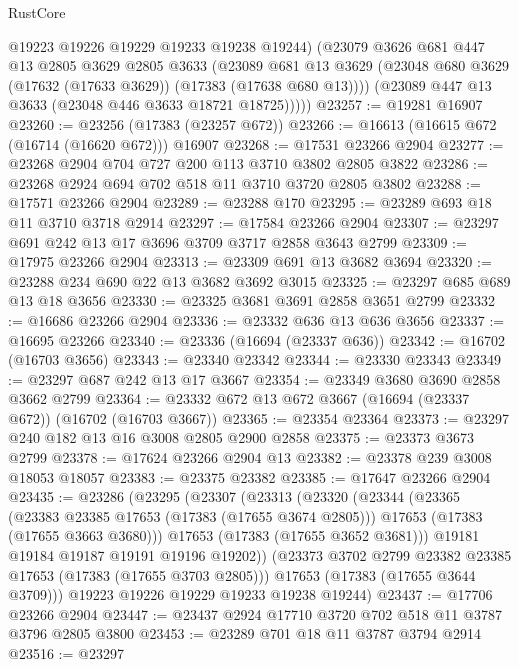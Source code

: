 \begin{lexlean}{RustCore}
\begin{coremodule}
          @19223
          @19226
          @19229
          @19233
          @19238
          @19244)
        (@23079
          @3626
          @681
          @447
          @13
          @2805
          @3629
          @2805
          @3633
          (@23089
            @681
            @13
            @3629
            (@23048 @680 @3629 (@17632 (@17633 @3629)) (@17383 (@17638 @680 @13))))
          (@23089 @447 @13 @3633 (@23048 @446 @3633 @18721 @18725)))))
@23257 := @19281 @16907
@23260 := @23256 (@17383 (@23257 @672))
@23266 := @16613 (@16615 @672 (@16714 (@16620 @672))) @16907
@23268 := @17531 @23266 @2904
@23277 := @23268 @2904 @704 @727 @200 @113 @3710 @3802 @2805 @3822
@23286 := @23268 @2924 @694 @702 @518 @11 @3710 @3720 @2805 @3802
@23288 := @17571 @23266 @2904
@23289 := @23288 @170
@23295 := @23289 @693 @18 @11 @3710 @3718 @2914
@23297 := @17584 @23266 @2904
@23307 := @23297 @691 @242 @13 @17 @3696 @3709 @3717 @2858 @3643 @2799
@23309 := @17975 @23266 @2904
@23313 := @23309 @691 @13 @3682 @3694
@23320 := @23288 @234 @690 @22 @13 @3682 @3692 @3015
@23325 := @23297 @685 @689 @13 @18 @3656
@23330 := @23325 @3681 @3691 @2858 @3651 @2799
@23332 := @16686 @23266 @2904
@23336 := @23332 @636 @13 @636 @3656
@23337 := @16695 @23266
@23340 := @23336 (@16694 (@23337 @636))
@23342 := @16702 (@16703 @3656)
@23343 := @23340 @23342
@23344 := @23330 @23343
@23349 := @23297 @687 @242 @13 @17 @3667
@23354 := @23349 @3680 @3690 @2858 @3662 @2799
@23364 := @23332 @672 @13 @672 @3667 (@16694 (@23337 @672)) (@16702 (@16703 @3667))
@23365 := @23354 @23364
@23373 := @23297 @240 @182 @13 @16 @3008 @2805 @2900 @2858
@23375 := @23373 @3673 @2799
@23378 := @17624 @23266 @2904 @13
@23382 := @23378 @239 @3008 @18053 @18057
@23383 := @23375 @23382
@23385 := @17647 @23266 @2904
@23435 := @23286
    (@23295
      (@23307
        (@23313
          (@23320
            (@23344
              (@23365
                (@23383 @23385 @17653 (@17383 (@17655 @3674 @2805)))
                @17653
                (@17383 (@17655 @3663 @3680)))
              @17653
              (@17383 (@17655 @3652 @3681)))
            @19181
            @19184
            @19187
            @19191
            @19196
            @19202))
        (@23373 @3702 @2799 @23382 @23385 @17653 (@17383 (@17655 @3703 @2805)))
        @17653
        (@17383 (@17655 @3644 @3709)))
      @19223
      @19226
      @19229
      @19233
      @19238
      @19244)
@23437 := @17706 @23266 @2904
@23447 := @23437 @2924 @17710 @3720 @702 @518 @11 @3787 @3796 @2805 @3800
@23453 := @23289 @701 @18 @11 @3787 @3794 @2914
@23516 := @23297

\end{coremodule}
\end{lexlean}
